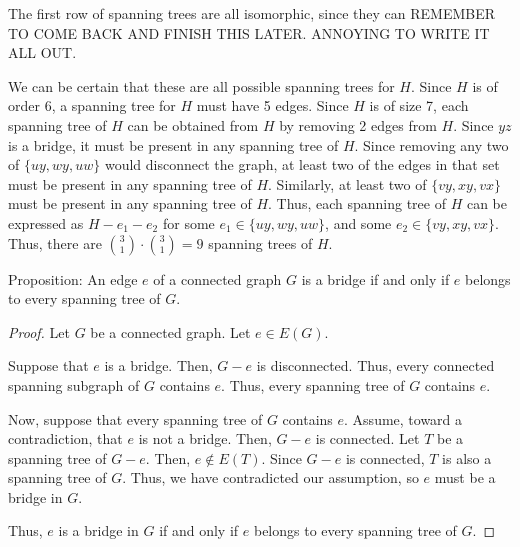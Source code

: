 \documentclass[12pt]{article}
\begin{document}
\begin{center}
    \end{center}

    The first row of spanning trees are all isomorphic, since they can %
    REMEMBER TO COME BACK AND FINISH THIS LATER. ANNOYING TO WRITE IT ALL OUT.

    We can be certain that these are all possible spanning trees for $H$. Since $H$ is of order 6, a spanning tree for $H$ must have 5 edges.
    Since $H$ is of size 7, each spanning tree of $H$ can be obtained from $H$ by removing 2 edges from $H$.
    Since $yz$ is a bridge, it must be present in any spanning tree of $H$.
    Since removing any two of $\{uy, wy, uw\}$ would disconnect the graph, at least two of the edges in that set must be present in any spanning tree of $H$.
    Similarly, at least two of $\{vy, xy, vx\}$ must be present in any spanning tree of $H$.
    Thus, each spanning tree of $H$ can be expressed as $H - e_1 - e_2$ for some $e_1 \in \{uy, wy, uw\}$, and some $e_2 \in \{vy, xy, vx\}$.
    Thus, there are ${3 \choose 1} \cdot {3 \choose 1} = 9$ spanning trees of $H$.

\newpage{} Proposition: An edge $e$ of a connected graph $G$ is a bridge if and only if $e$ belongs to every spanning tree of $G$.
\begin{proof}
    Let $G$ be a connected graph.
    Let $e \in E(G)$.

    Suppose that $e$ is a bridge.
    Then, $G-e$ is disconnected.
    Thus, every connected spanning subgraph of $G$ contains $e$.
    Thus, every spanning tree of $G$ contains $e$.

    Now, suppose that every spanning tree of $G$ contains $e$.
    Assume, toward a contradiction, that $e$ is not a bridge.
    Then, $G-e$ is connected.
    Let $T$ be a spanning tree of $G-e$.
    Then, $e \notin E(T)$.
    Since $G-e$ is connected, $T$ is also a spanning tree of $G$.
    Thus, we have contradicted our assumption, so $e$ must be a bridge in $G$.

    Thus, $e$ is a bridge in $G$ if and only if $e$ belongs to every spanning tree of $G$.
\end{proof}
\end{document}
